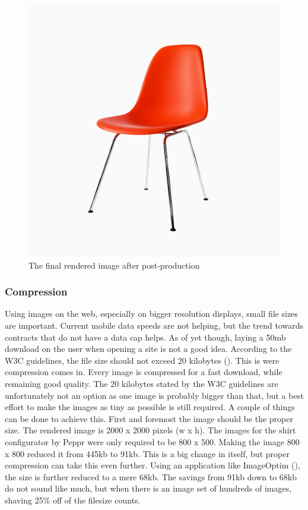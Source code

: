 \begin{figure}
\centering
\includegraphics[width=15cm]{images/post}
\caption{The final rendered image after post-production}
\label{figure:post_production}
\end{figure}
\subsubsection{Compression}
Using images on the web, especially on bigger resolution displays, small file sizes are important. Current mobile data speeds are not helping, but the trend towards contracts that do not have a data cap helps. As of yet though, laying a 50mb download on the user when opening a site is not a good idea. According to the W3C guidelines, the file size should not exceed 20 kilobytes (\cite{pageFileSizeLimit}). This is were compression comes in. Every image is compressed for a fast download, while remaining good quality. The 20 kilobytes stated by the W3C guidelines are unfortunately not an option as one image is probably bigger than that, but a best effort to make the images as tiny as possible is still required.
A couple of things can be done to achieve this. First and foremost the image should be the proper size. The rendered image is 2000 x 2000 pixels (w x h). The images for the shirt configurator by Peppr were only required to be 800 x 500. Making the image 800 x 800 reduced it from 445kb to 91kb. This is a big change in itself, but  proper compression can take this even further. Using an application like ImageOptim (\cite{imageOptim}), the size is further reduced to a mere 68kb. The savings from 91kb down to 68kb do not sound like much, but when there is an image set of hundreds of images, shaving 25\% off of the filesize counts.


